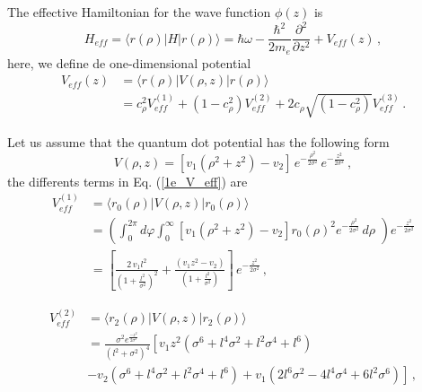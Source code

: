 \documentclass[a4paper,10pt]{article}
\begin{document}
The effective Hamiltonian for the wave function $\phi(z)$ is
\begin{equation}
  H_{eff} = \langle r(\rho)|H|r(\rho)\rangle = \hbar \omega - \frac{\hbar^2}{2 m_e}\frac{\partial^2}{\partial z^2} + V_{eff}(z)\,,
\end{equation}
\noindent here, we define de one-dimensional potential
\begin{equation}\label{1e_V_eff}
  \begin{split}
  V_{eff}(z) &= \langle r(\rho)|V(\rho,z)|r(\rho)\rangle \\
             &= c_{\rho}^2 V_{eff}^{(1)} + (1-c_{\rho}^2) V_{eff}^{(2)} + 2c_{\rho}\sqrt{(1-c_{\rho}^2)} V_{eff}^{(3)}\,.
  \end{split}
\end{equation}

Let us assume that the quantum dot potential has the following form
\begin{equation}
  V(\rho,z) = \left[v_1\left(\rho^2+z^2 \right) - v_2 \right] \,e^{-\frac{\rho^2}{2\sigma^2}}\, e^{-\frac{z^2}{2\sigma^2}}\,,
\end{equation}
\noindent the differents terms in Eq. (\ref{1e_V_eff}) are
\begin{equation}
  \begin{split}
  V_{eff}^{(1)} &= \langle r_0(\rho) \lvert V(\rho,z) \lvert r_0(\rho) \rangle\\
             &= \left(\int_0^{2\pi}d\varphi\int_0^{\infty} \left[v_1\left(\rho^2+z^2 \right) - v_2 \right] r_0(\rho)^2 e^{-\frac{\rho^2}{2\sigma^2}}\,d\rho\,\,\right) e^{-\frac{z^2}{2\sigma^2}} \\
             &= \left[\frac{2\,v_1 l^2}{\left(1 + \frac{l^2}{\sigma^2}\right)^2} + \frac{(v_1 z^2 - v_2)}{\left(1 + \frac{l^2}{\sigma^2}\right)} \right]\, e^{-\frac{z^2}{2\sigma^2}}\, ,
  \end{split}
\end{equation}

\begin{equation}
  \begin{split}
    V_{eff}^{(2)} &= \langle r_2(\rho) \lvert V(\rho,z) \lvert r_2(\rho) \rangle \\
    &= \frac{\sigma^2 e^{\frac{-z^2}{2\sigma^2}}}{(l^2+\sigma^2)^4}\left[v_1 z^2 \left(\sigma^6 + l^4\sigma^2 + l^2\sigma^4 + l^6\right) \right.\\
    &\left.- v_2 \left( \sigma^6 + l^4 \sigma^2 + l^2 \sigma^4 + l^6 \right) +v_1\left( 2l^6\sigma^2 - 4 l^4\sigma^4 + 6l^2\sigma^6 \right) \right]\, ,
  \end{split}
\end{equation}
\end{document}
